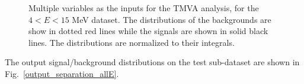 \begin{figure}[htbp]
{\begin{minipage}[b]{0.3\textwidth}
		\end{minipage}
	}
	\caption[Multiple variables as the inputs for the TMVA analysis, for the $4<E<15$ MeV dataset.]{Multiple variables as the inputs for the TMVA analysis, for the $4<E<15$ MeV dataset. The distributions of the backgrounds are show in dotted red lines while the signals are shown in solid black lines. The distributions are normalized to their integrals.\label{fig:inputParamsTMVA}}
\end{figure}

The output signal/background distributions on the test sub-dataset are shown in Fig.~\ref{output_separation_allE}.
